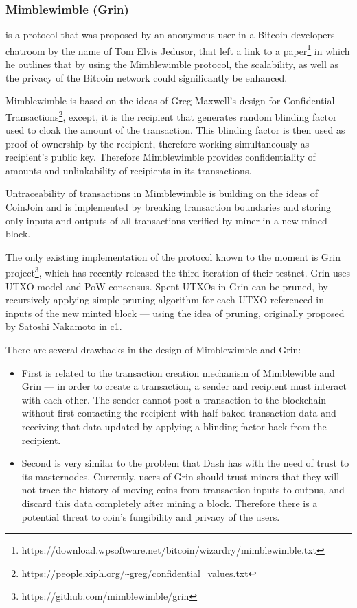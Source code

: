 \documentclass[a4paper, 10pt, conference]{ieeeconf}
\begin{document}
\subsubsection{Mimblewimble (Grin)}

is a protocol that was proposed by an anonymous user in a Bitcoin developers chatroom by the name of Tom Elvis Jedusor, that left a link to a paper\footnote{https://download.wpsoftware.net/bitcoin/wizardry/mimblewimble.txt} in which he outlines that by using the Mimblewimble protocol, the scalability, as well as the privacy of the Bitcoin network could significantly be enhanced.

Mimblewimble is based on the ideas of Greg Maxwell's design for Confidential Transactions\footnote{https://people.xiph.org/\texttt{\~{}}greg/confidential\_values.txt},  except, it is the recipient that generates random blinding factor used to cloak the amount of the transaction. This blinding factor is then used as proof of ownership by the recipient, therefore working simultaneously as recipient's public key. Therefore Mimblewimble provides confidentiality of amounts and unlinkability of recipients in its transactions.

Untraceability of transactions in Mimblewimble is building on the ideas of CoinJoin and is implemented by breaking transaction boundaries and storing only inputs and outputs of all transactions verified by miner in a new mined block.

The only existing implementation of the protocol known to the moment is Grin project\footnote{https://github.com/mimblewimble/grin}, which has recently released the third iteration of their testnet. Grin uses UTXO model and PoW consensus. Spent UTXOs in Grin can be pruned, by recursively applying simple pruning algorithm for each UTXO referenced in inputs of the new minted block --- using the idea of pruning, originally proposed by Satoshi Nakamoto in {c1}.

There are several drawbacks in the design of Mimblewimble and Grin:

\begin{itemize}

\item{First is related to the transaction creation mechanism of Mimblewible and Grin --- in order to create a transaction, a sender and recipient must interact with each other. The sender cannot post a transaction to the blockchain without first contacting the recipient with half-baked transaction data and receiving that data updated by applying a blinding factor back from the recipient.}
\item{Second is very similar to the problem that Dash has with the need of trust to its masternodes. Currently, users of Grin should trust miners that they will not trace the history of moving coins from transaction inputs to outpus, and discard this data completely after mining a block. Therefore there is a potential threat to coin's fungibility and privacy of the users.}

\end{itemize}
\end{document}
